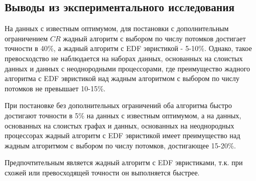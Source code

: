 \subsection{Выводы из экспериментального исследования}

На данных с известным оптимумом, для постановки с дополнительным ограничением $CR$ жадный алгоритм с выбором по числу потомков достигает точности в 40\%, а жадный алгоритм с EDF эвристикой - 5-10\%. Однако, такое превосходство не наблюдается на наборах данных, основанных на слоистых данных и данных с неоднородными процессорами, где преимущество жадного алгоритма с EDF эвристикой над жадным алгоритмом с выбором по числу потомков не превышает 10-15\%. 

При постановке без дополнительных ограничений оба алгоритма быстро достигают точности в 5\% на данных с известным оптимумом, а на данных, основанных на слоистых графах и данных, основанных на неоднородных процессорах жадный алгоритм с EDF эвристикой имеет преимущество над жадным алгоритмом с выбором по числу потомков, достигающее 15-20\%.

Предпочтительным является жадный алгоритм с EDF эвристиками, т.к. при схожей или превосходящей точности он выполняется быстрее.